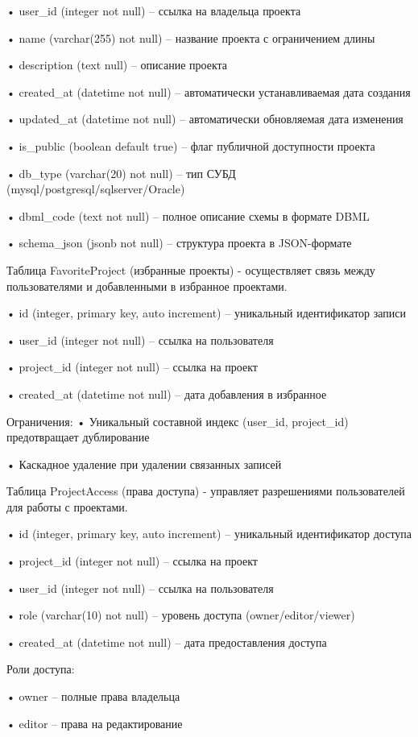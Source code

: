 • user\_id (integer not null) – ссылка на владельца проекта

• name (varchar(255) not null) – название проекта с ограничением длины

• description (text null) – описание проекта

• created\_at (datetime not null) – автоматически устанавливаемая дата 
создания

• updated\_at (datetime not null) – автоматически обновляемая дата изменения

• is\_public (boolean default true) – флаг публичной доступности проекта

• db\_type (varchar(20) not null) – тип СУБД (mysql/postgresql/sqlserver/Oracle)

• dbml\_code (text not null) – полное описание схемы в формате DBML

• schema\_json (jsonb not null) – структура проекта в JSON-формате

Таблица FavoriteProject (избранные проекты) - осуществляет связь между пользователями и добавленными в избранное проектами.

• id (integer, primary key, auto increment) – уникальный идентификатор записи

• user\_id (integer not null) – ссылка на пользователя

• project\_id (integer not null) – ссылка на проект

• created\_at (datetime not null) – дата добавления в избранное

Ограничения:
• Уникальный составной индекс (user\_id, project\_id) предотвращает дублирование

• Каскадное удаление при удалении связанных записей

Таблица ProjectAccess (права доступа) - управляет разрешениями пользователей для работы с проектами.

• id (integer, primary key, auto increment) – уникальный идентификатор доступа

• project\_id (integer not null) – ссылка на проект

• user\_id (integer not null) – ссылка на пользователя

• role (varchar(10) not null) – уровень доступа (owner/editor/viewer)

• created\_at (datetime not null) – дата предоставления доступа

Роли доступа:

• owner – полные права владельца

• editor – права на редактирование

